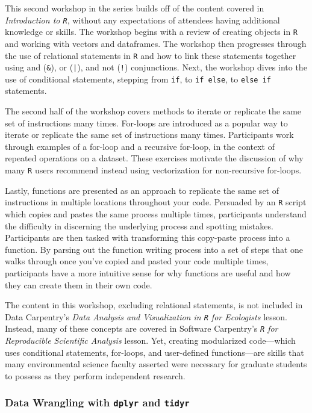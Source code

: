 \documentclass[12pt]{article}
\begin{document}
\quad This second workshop in the series builds off of the content covered in \emph{Introduction to \texttt{R}}, without any expectations of attendees having additional knowledge or skills. The workshop begins with a review of creating objects in \texttt{R} and working with vectors and dataframes. The workshop then progresses through the use of relational statements in \texttt{R} and how to link these statements together using and (\texttt{\&}), or (\texttt{|}), and not (\texttt{!}) conjunctions. Next, the workshop dives into the use of conditional statements, stepping from \texttt{if}, to \texttt{if else}, to \texttt{else if} statements. 

\quad The second half of the workshop covers methods to iterate or replicate the same set of instructions many times. For-loops are introduced as a popular way to iterate or replicate the same set of instructions many times. Participants work through examples of a for-loop and a recursive for-loop, in the context of repeated operations on a dataset. These exercises motivate the discussion of why many \texttt{R} users recommend instead using vectorization for non-recursive for-loops. 

\quad Lastly, functions are presented as an approach to replicate the same set of instructions in multiple locations throughout your code. Persuaded by an \texttt{R} script which copies and pastes the same process multiple times, participants understand the difficulty in discerning the underlying process and spotting mistakes. Participants are then tasked with transforming this copy-paste process into a function. By parsing out the function writing process into a set of steps that one walks through once you've copied and pasted your code multiple times, participants have a more intuitive sense for why functions are useful and how they can create them in their own code.

\quad The content in this workshop, excluding relational statements, is not included in Data Carpentry's \emph{Data Analysis and Visualization in \texttt{R} for Ecologists} lesson. Instead, many of these concepts are covered in Software Carpentry's \emph{\texttt{R} for Reproducible Scientific Analysis} lesson. Yet, creating modularized code---which uses conditional statements, for-loops, and user-defined functions---are skills that many environmental science faculty asserted were necessary for graduate students to possess as they perform independent research.  


\subsubsection{Data Wrangling with \texttt{dplyr} and \texttt{tidyr}}
\label{sec:wrangle}
\end{document}
